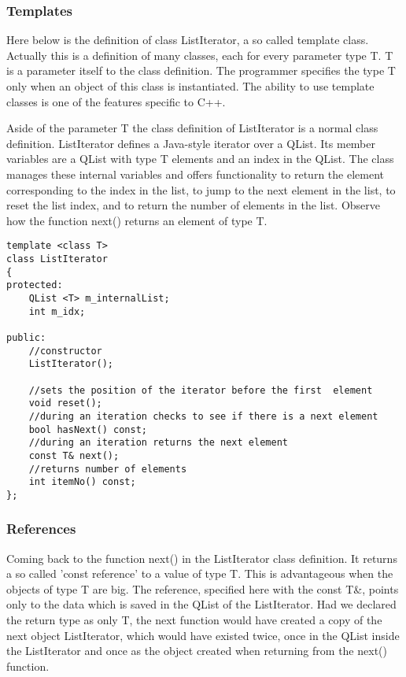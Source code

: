 \subsubsection {Templates}

Here below is the definition of class ListIterator, a so called template class. Actually this is a definition of many classes, each for every parameter type T. T is a parameter itself to the class definition. The programmer specifies the type T only when an object of this class is instantiated. The ability to use template classes is one of the features specific to C++.

Aside of the parameter T the class definition of ListIterator is a normal class definition. ListIterator defines a Java-style iterator over a QList. Its member variables are a QList with type T elements and an index in the QList. The class manages these internal variables and offers functionality to return the element corresponding to the index in the list, to jump to the next element in the list, to reset the list index, and to return the number of elements in the list. Observe how the function next() returns an element of type T.

\begin{lstlisting}
template <class T>
class ListIterator
{
protected:
    QList <T> m_internalList;
    int m_idx;

public:
    //constructor
    ListIterator();

    //sets the position of the iterator before the first  element
    void reset();
    //during an iteration checks to see if there is a next element
    bool hasNext() const;
    //during an iteration returns the next element
    const T& next();
    //returns number of elements
    int itemNo() const;
};
\end{lstlisting}

\subsubsection {References}

Coming back to the function next() in the ListIterator class definition. It returns a so called 'const reference' to a value of type T. This is advantageous when the objects of type T are big. The reference, specified here with the const T\&, points only to the data which is saved in the QList of the ListIterator. Had we declared the return type as only T, the next function would have created a copy of the next object ListIterator, which would have existed twice, once in the QList inside the ListIterator and once as the object created when returning from the next() function.

